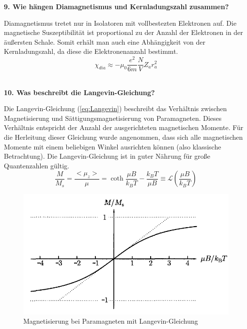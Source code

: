 \noindent\textbf{9. Wie hängen Diamagnetismus und Kernladungszahl zusammen?}\\
\begin{addmargin}[25pt]{0pt}
Diamagnetismus tretet nur in Isolatoren mit vollbestezten Elektronen auf. Die magnetische Suszeptibilität ist proportional zu der Anzahl der Elektronen in der äußersten Schale. Somit erhält man auch eine Abhängigkeit von der Kernladungszahl, da diese die Elektronenanzahl bestimmt.
\begin{equation}
    \chi_{dia} \approx -\mu_{0}\frac{e^2}{6m}\frac{N}{V}Z_{a}r^2_{a}
\end{equation}\\
\end{addmargin}

\noindent\textbf{10. Was beschreibt die Langevin-Gleichung?}\\
\begin{addmargin}[25pt]{0pt}
Die Langevin-Gleichung (\ref{eq:Langevin}) beschreibt das Verhältnis zwischen Magnetisierung und Sättigungsmagnetisierung von Paramagneten. Dieses Verhältnis entspricht der Anzahl der ausgerichteten magnetischen Momente. Für die Herleitung dieser Gleichung wurde angenommen, dass sich alle magnetischen Momente mit einem beliebigen Winkel ausrichten können (also klassische Betrachtung). Die Langevin-Gleichung ist in guter Nährung für große Quantenzahlen gültig.
\begin{equation}
    \frac{M}{M_{s}} = \frac{<\mu_{z}>}{\mu} = \coth{\frac{\mu B}{k_{B}T}} - \frac{k_{B}T}{\mu B} \equiv \mathcal{L} \left(\frac{\mu B}{k_{B}T}\right)
    \label{eq:Langevin}
\end{equation}
\begin{figure}
    \centering
    \includegraphics[scale=0.5]{images/KM2/Langevin-Velauf.png}
    \caption{Magnetisierung bei Paramagneten mit Langevin-Gleichung}
    \label{fig:Magnetisierung-Paramag}
\end{figure}\\
\end{addmargin}

